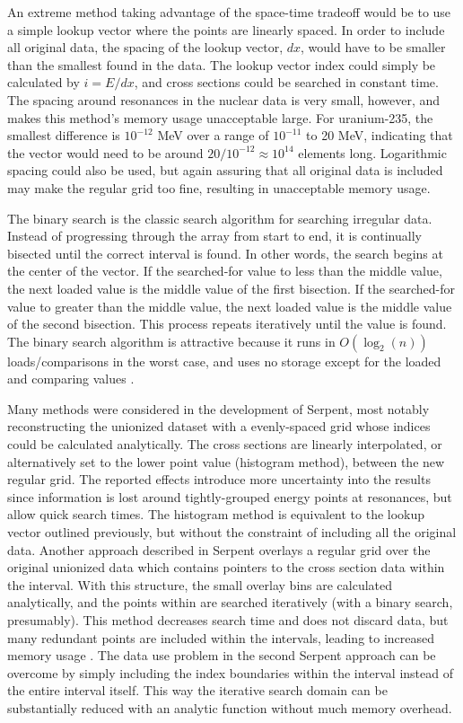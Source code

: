 An extreme method taking advantage of the space-time tradeoff would be to use a simple lookup vector where the points are linearly spaced.  In order to include all original data, the spacing of the lookup vector, $dx$, would have to be smaller than the smallest found in the data.  The lookup vector index could simply be calculated by $i=E/dx$, and cross sections could be searched in constant time.  The spacing around resonances in the nuclear data is very small, however, and makes this method's memory usage unacceptable large.  For uranium-235, the smallest difference is $10^{-12}$ MeV over a range of $10^{-11}$ to 20 MeV, indicating that the vector would need to be around $20/10^{-12} \approx 10^{14}$ elements long.  Logarithmic spacing could also be used, but again assuring that all original data is included may make the regular grid too fine, resulting in unacceptable memory usage.

The binary search is the classic search algorithm for searching irregular data.  Instead of progressing through the array from start to end, it is continually bisected until the correct interval is found.  In other words, the search begins at the center of the vector.  If the searched-for value to less than the middle value, the next loaded value is the middle value of the first bisection.  If the searched-for value to greater than the middle value, the next loaded value is the middle value of the second bisection.  This process repeats iteratively until the value is found.  The binary search algorithm is attractive because it runs in $O(\log_2(n))$ loads/comparisons in the worst case, and uses no storage except for the loaded and comparing values \cite{binary}.

Many methods were considered in the development of Serpent, most notably reconstructing the unionized dataset with a evenly-spaced grid whose indices could be calculated analytically.  The cross sections are linearly interpolated, or alternatively set to the lower point value (histogram method), between the new regular grid.  The reported effects introduce more uncertainty into the results since information is lost around tightly-grouped energy points at resonances, but allow quick search times.  The histogram method is equivalent to the lookup vector outlined previously, but without the constraint of including all the original data.  Another approach described in Serpent overlays a regular grid over the original unionized data which contains pointers to the cross section data within the interval.  With this structure, the small overlay bins are calculated analytically, and the points within are searched iteratively (with a binary search, presumably).  This method decreases search time and does not discard data, but many redundant points are included within the intervals, leading to increased memory usage \cite {jaakko}.   The data use problem in the second Serpent approach can be overcome by simply including the index boundaries within the interval instead of the entire interval itself.  This way the iterative search domain can be substantially reduced with an analytic function without much memory overhead.

